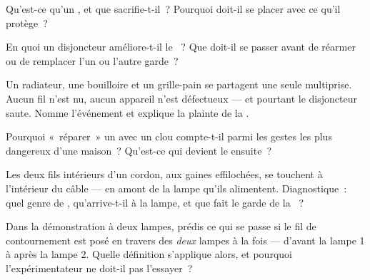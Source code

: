 \begin{exercise}[$\star$]\label{exo:g7:short-circuits-safety:5}
Qu'est-ce qu'un , et que sacrifie-t-il~? Pourquoi doit-il se
placer  avec ce qu'il protège~?
\end{exercise}

\begin{exercise}[$\star$]\label{exo:g7:short-circuits-safety:6}
En quoi un disjoncteur améliore-t-il le ~? Que doit-il se
passer avant de réarmer ou de remplacer l'un ou l'autre garde~?
\end{exercise}

\begin{exercise}[$\star$]\label{exo:g7:short-circuits-safety:7}
Un radiateur, une bouilloire et un grille-pain se partagent une seule
multiprise. Aucun fil n'est nu, aucun appareil n'est défectueux ---
et pourtant le disjoncteur saute. Nomme l'événement et explique la
plainte de la .
\end{exercise}

\begin{exercise}[$\star$]\label{exo:g7:short-circuits-safety:8}
Pourquoi «~réparer~» un  avec un clou compte-t-il parmi les
gestes les plus dangereux d'une maison~? Qu'est-ce qui devient le
 ensuite~?
\end{exercise}

\begin{exercise}[$\star\star$]\label{exo:g7:short-circuits-safety:9}
Les deux fils intérieurs d'un cordon, aux gaines effilochées, se
touchent à l'intérieur du câble --- en amont de la lampe qu'ils
alimentent. Diagnostique~: quel genre de ,
qu'arrive-t-il à la lampe, et que fait le garde de la ~?
\end{exercise}

\begin{exercise}[$\star\star$]\label{exo:g7:short-circuits-safety:10}
Dans la démonstration à deux lampes, prédis ce qui se passe si le fil
de contournement est posé en travers des \emph{deux} lampes à la fois
--- d'avant la lampe 1 à après la lampe 2. Quelle définition
s'applique alors, et pourquoi l'expérimentateur ne doit-il pas
l'essayer~?
\end{exercise}

